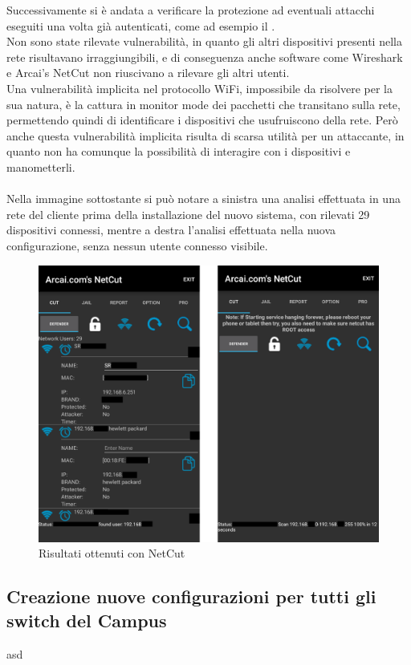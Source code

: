 \documentclass[Realizzazione.tex]{subfiles}
\begin{document}
Successivamente si è andata a verificare la protezione ad eventuali attacchi eseguiti una volta già autenticati, come ad esempio il . \\
Non sono state rilevate vulnerabilità, in quanto gli altri dispositivi presenti nella rete risultavano irraggiungibili, e di conseguenza anche software come Wireshark e Arcai's NetCut non riuscivano a rilevare gli altri utenti. \\
Una vulnerabilità implicita nel protocollo WiFi, impossibile da risolvere per la sua natura, è la cattura in monitor mode dei pacchetti che transitano sulla rete, permettendo quindi di identificare i dispositivi che usufruiscono della rete. Però anche questa vulnerabilità implicita risulta di scarsa utilità per un attaccante, in quanto non ha comunque la possibilità di interagire con i dispositivi e manometterli. \\\\
Nella immagine sottostante si può notare a sinistra una analisi effettuata in una rete del cliente prima della installazione del nuovo sistema, con rilevati 29 dispositivi connessi, mentre a destra l'analisi effettuata nella nuova configurazione, senza nessun utente connesso visibile.
\begin{figure}[H]
	\centering
	\includegraphics[width=1\linewidth]{"images/netcut"}
	\caption{Risultati ottenuti con NetCut}
	\label{fig:Risultati ottenuti con NetCut}
\end{figure}


\subsection{Creazione nuove configurazioni per tutti gli switch del Campus} 
asd
\end{document}
